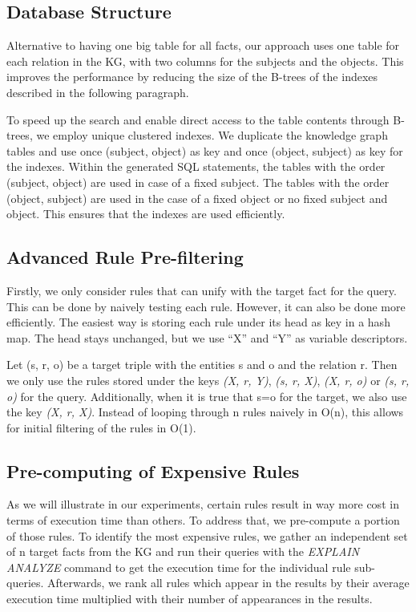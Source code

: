 \documentclass[english]{lni}
\begin{document}
\subsection{Database Structure}
\label{database-structure}
Alternative to having one big table for all facts, our approach uses one table for each relation in the KG, with two columns for the subjects and the objects. This improves the performance by reducing the size of the B-trees of the indexes described in the following paragraph.

To speed up the search and enable direct access to the table contents through B-trees, we employ unique clustered indexes. We duplicate the knowledge graph tables and use once (subject, object) as key and once (object, subject) as key for the indexes. Within the generated SQL statements, the tables with the order (subject, object) are used in case of a fixed subject. The tables with the order (object, subject) are used in the case of a fixed object or no fixed subject and object. This ensures that the indexes are used efficiently.

\subsection{Advanced Rule Pre-filtering} 
Firstly, we only consider rules that can unify with the target fact for the query. This can be done by naively testing each rule. However, it can also be done more efficiently. The easiest way is storing each rule under its head as key in a hash map. The head stays unchanged, but we use “X” and “Y” as variable descriptors.

Let (s, r, o) be a target triple with the entities s and o and the relation r. Then we only use the rules stored under the keys \textit{(X, r, Y)}, \textit{(s, r, X)}, \textit{(X, r, o)} or \textit{(s, r, o)} for the query. Additionally, when it is true that s=o for the target, we also use the key \textit{(X, r, X)}. Instead of looping through n rules naively in O(n), this allows for initial filtering of the rules in O(1).

\subsection{Pre-computing of Expensive Rules}
\label{pre-computation}
As we will illustrate in our experiments, certain rules result in way more cost in terms of execution time than others. To address that, we pre-compute a portion of those rules. To identify the most expensive rules, we gather an independent set of n target facts from the KG and run their queries with the \textit{EXPLAIN ANALYZE} command to get the execution time for the individual rule sub-queries. Afterwards, we rank all rules which appear in the results by their average execution time multiplied with their number of appearances in the results. 
\end{document}
